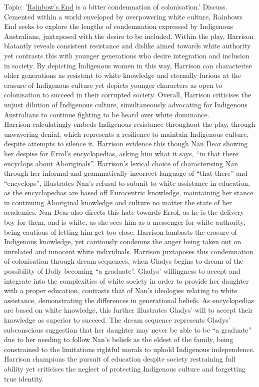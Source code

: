 \documentclass[a4paper]{article}
\begin{document}
Topic: '\underline{Rainbow's End} is a bitter condemnation of colonisation.' Discuss.\\
Cemented within a world enveloped by overpowering white culture, Rainbows End seeks to
explore the lengths of condemnation expressed by Indigenous Australians, juxtaposed with
the desire to be included. Within the play, Harrison blatantly reveals consistent resistance
and dislike aimed towards white authority yet contrasts this with younger generations who
desire integration and inclusion in society. By depicting Indigenous women in this way,
Harrison can characterise older generations as resistant to white knowledge and eternally
furious at the erasure of Indigenous culture yet depicts younger characters as open to
colonisation to succeed in their corrupted society. Overall, Harrison criticises the unjust
dilution of Indigenous culture, simultaneously advocating for Indigenous Australians to
continue fighting to be heard over white dominance.\\

Harrison calculatingly embeds Indigenous resistance throughout the play, through
unwavering denial, which represents a resilience to maintain Indigenous culture, despite
attempts to silence it. Harrison evidence this though Nan Dear showing her despise for
Errol’s encyclopedias, asking him what it says, “in that there encyclops about Aboriginals”.
Harrison’s lexical choice of characterising Nan through her informal and grammatically
incorrect language of “that there” and “encyclops”, illustrates Nan’s refusal to submit to white
assistance in education, as the encyclopedias are based off Eurocentric knowledge,
maintaining her stance in continuing Aboriginal knowledge and culture no matter the state of
her academics. Nan Dear also directs this hate towards Errol, as he is the delivery boy for
them, and is white, as she sees him as a messenger for white authority, being cautious of
letting him get too close. Harrison lambasts the erasure of Indigenous knowledge, yet
cautiously condemns the anger being taken out on unrelated and innocent white individuals.
Harrison juxtaposes this condemnation of colonisation through dream sequences, when
Gladys begins to dream of the possibility of Dolly becoming “a graduate”. Gladys’ willingness
to accept and integrate into the complexities of white society in order to provide her daughter
with a proper education, contrasts that of Nan’s ideologies relating to white assistance,
demonstrating the differences in generational beliefs. As encyclopedias are based on white
knowledge, this further illustrates Gladys’ will to accept their knowledge as superior to
succeed. The dream sequence represents Gladys’ subconscious suggestion that her
daughter may never be able to be “a graduate” due to her needing to follow Nan’s beliefs as
the eldest of the family, being constrained to the limitations rightful morals to uphold
Indigenous independence. Harrison champions the pursuit of education despite society
restraining full ability yet criticises the neglect of protecting Indigenous culture and forgetting
true identity.\\
\end{document}
